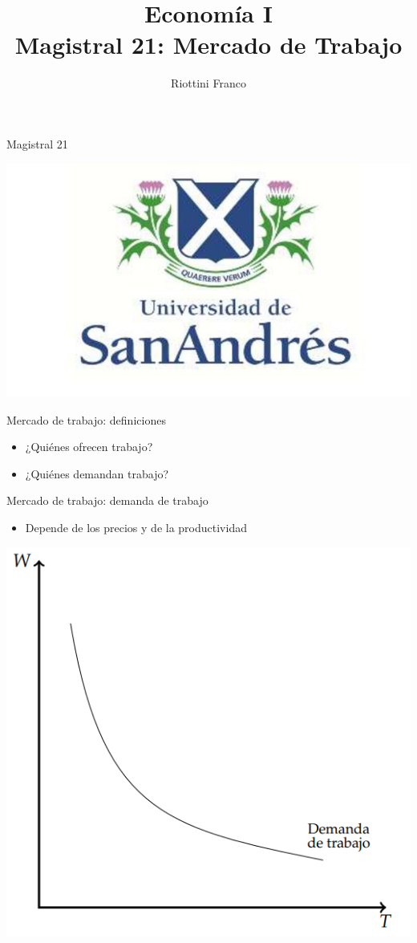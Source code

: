 \documentclass{beamer}
\title[Economía I]{Economía I \vspace{4mm}
\\ Magistral 21: Mercado de Trabajo}
\date{}
\author[Riottini]{Riottini Franco}
\institute[]{Universidad de San Andrés}
\begin{document}
\begin{frame}
\titlepage
\centering
Magistral 21

\includegraphics[scale=0.2]{../Figures/logoUDESA.jpg} 
\end{frame}


\begin{frame}{Mercado de trabajo: definiciones}
    \begin{itemize}
        \item ¿Quiénes ofrecen trabajo?
        \item ¿Quiénes demandan trabajo?
    \end{itemize} 
\end{frame}


\begin{frame}{Mercado de trabajo: demanda de trabajo}
    \begin{itemize}
        \item Depende de los precios y de la productividad 
    \end{itemize}
    \centering
    \includegraphics[scale=0.6]{../Figures/C34.1.png} 
\end{frame}
\end{document}
